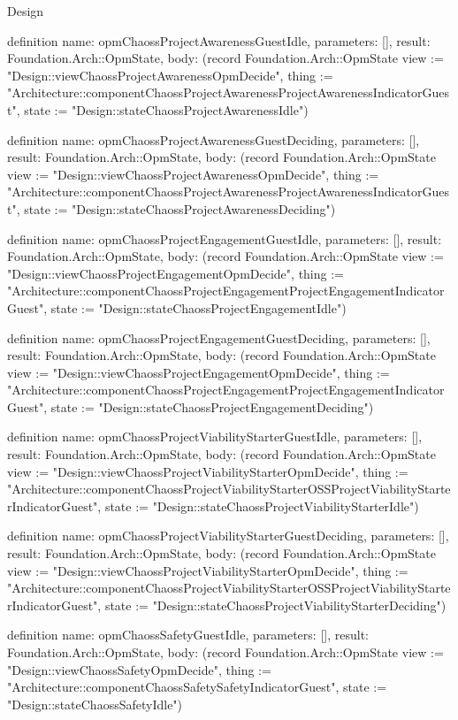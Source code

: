 \begin{lexlean}{Design}
\begin{semanticmodule}
definition{
  name: opmChaossProjectAwarenessGuestIdle,
  parameters: [],
  result: Foundation.Arch::OpmState,
  body: (record Foundation.Arch::OpmState {view := "Design::viewChaossProjectAwarenessOpmDecide", thing := "Architecture::componentChaossProjectAwarenessProjectAwarenessIndicatorGuest", state := "Design::stateChaossProjectAwarenessIdle"})
}

definition{
  name: opmChaossProjectAwarenessGuestDeciding,
  parameters: [],
  result: Foundation.Arch::OpmState,
  body: (record Foundation.Arch::OpmState {view := "Design::viewChaossProjectAwarenessOpmDecide", thing := "Architecture::componentChaossProjectAwarenessProjectAwarenessIndicatorGuest", state := "Design::stateChaossProjectAwarenessDeciding"})
}

definition{
  name: opmChaossProjectEngagementGuestIdle,
  parameters: [],
  result: Foundation.Arch::OpmState,
  body: (record Foundation.Arch::OpmState {view := "Design::viewChaossProjectEngagementOpmDecide", thing := "Architecture::componentChaossProjectEngagementProjectEngagementIndicatorGuest", state := "Design::stateChaossProjectEngagementIdle"})
}

definition{
  name: opmChaossProjectEngagementGuestDeciding,
  parameters: [],
  result: Foundation.Arch::OpmState,
  body: (record Foundation.Arch::OpmState {view := "Design::viewChaossProjectEngagementOpmDecide", thing := "Architecture::componentChaossProjectEngagementProjectEngagementIndicatorGuest", state := "Design::stateChaossProjectEngagementDeciding"})
}

definition{
  name: opmChaossProjectViabilityStarterGuestIdle,
  parameters: [],
  result: Foundation.Arch::OpmState,
  body: (record Foundation.Arch::OpmState {view := "Design::viewChaossProjectViabilityStarterOpmDecide", thing := "Architecture::componentChaossProjectViabilityStarterOSSProjectViabilityStarterIndicatorGuest", state := "Design::stateChaossProjectViabilityStarterIdle"})
}

definition{
  name: opmChaossProjectViabilityStarterGuestDeciding,
  parameters: [],
  result: Foundation.Arch::OpmState,
  body: (record Foundation.Arch::OpmState {view := "Design::viewChaossProjectViabilityStarterOpmDecide", thing := "Architecture::componentChaossProjectViabilityStarterOSSProjectViabilityStarterIndicatorGuest", state := "Design::stateChaossProjectViabilityStarterDeciding"})
}

definition{
  name: opmChaossSafetyGuestIdle,
  parameters: [],
  result: Foundation.Arch::OpmState,
  body: (record Foundation.Arch::OpmState {view := "Design::viewChaossSafetyOpmDecide", thing := "Architecture::componentChaossSafetySafetyIndicatorGuest", state := "Design::stateChaossSafetyIdle"})
}


\end{semanticmodule}
\end{lexlean}

